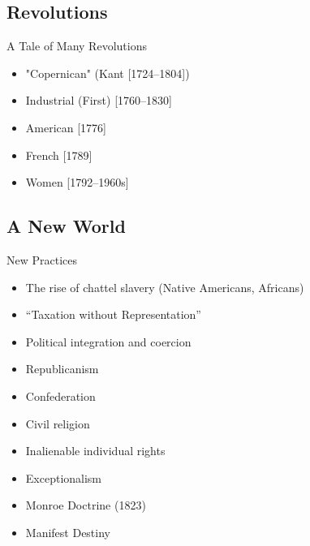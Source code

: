 


\subsection{Revolutions}
\begin{frame}{A Tale of Many Revolutions}
	\begin{itemize}
		\item<1->"Copernican" (Kant [1724--1804])
		\item<2->Industrial (First) [1760--1830]
		\item<3->American [1776]
		\item<4->French [1789]
		\item<5->Women [1792--1960s]
	\end{itemize}
\end{frame}

\subsection{A New World}
\begin{frame}{New Practices}
	\begin{itemize}
		\item<1->The rise of chattel slavery (Native Americans, Africans)
		\item<2->``Taxation without Representation''
		\item<3->Political integration and coercion
		\item<4->Republicanism
		\item<5->Confederation
		\item<6->Civil religion
		\item<7->Inalienable individual rights
		\item<8->Exceptionalism
		\item<9->Monroe Doctrine (1823)
		\item<10->Manifest Destiny
	\end{itemize}
\end{frame}

